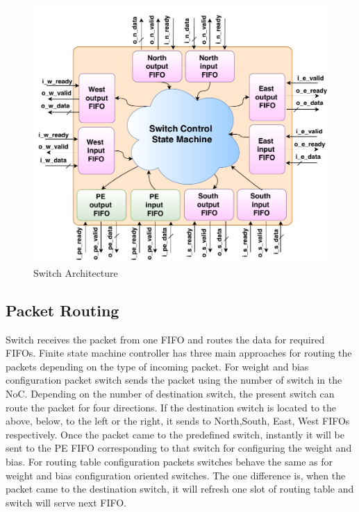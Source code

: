 \begin{figure}
    \begin{center}
    \includegraphics[width=0.95\columnwidth]{Figures/switch2.pdf}
    \caption{Switch Architecture} 
    \end{center}
    \label{fig_switch}
\end{figure}

\subsection{Packet Routing}
\label{subsec_routing}
 Switch receives the packet from one FIFO and routes the data for required FIFOs. Finite state machine controller has three main approaches for routing the packets depending on the type of incoming packet.
 For weight and bias configuration packet switch sends the packet using the number of switch in the NoC. Depending on the number of destination switch, the present switch can route the packet for four directions. If the destination switch is located to the above, below, to the left or the right, it sends to North,South, East, West FIFOs respectively. Once the packet came to the predefined switch, instantly it will be sent to the PE FIFO corresponding to that switch for configuring the weight and bias.   
For routing table configuration packets switches behave the same as for weight and bias configuration oriented switches. The one difference is, when the packet came to the destination switch, it will refresh one slot of routing table and switch will serve next FIFO. 


